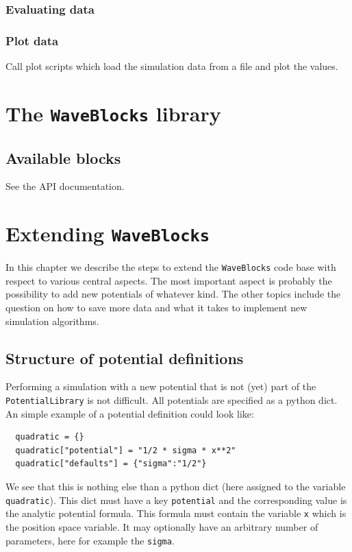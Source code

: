 \documentclass[a4paper,10pt]{report}
\begin{document}
\subsection{Evaluating data}

\subsection{Plot data}

Call plot scripts which load the simulation data from a file and plot the values.



\chapter{The \texttt{WaveBlocks} library}

\section{Available blocks}

See the API documentation.


\chapter{Extending \texttt{WaveBlocks}}

In this chapter we describe the steps to extend the \texttt{WaveBlocks}
code base with respect to various central aspects. The most important aspect
is probably the possibility to add new potentials of whatever kind. The other
topics include the question on how to save more data and what it takes to
implement new simulation algorithms.

\section{Structure of potential definitions}

Performing a simulation with a new potential that is not (yet) part of the
\texttt{PotentialLibrary} is not difficult. All potentials are specified
as a python dict. An simple example of a potential definition could look like:

\begin{verbatim}
  quadratic = {}
  quadratic["potential"] = "1/2 * sigma * x**2"
  quadratic["defaults"] = {"sigma":"1/2"}
\end{verbatim}

We see that this is nothing else than a python dict (here assigned to the
variable \texttt{quadratic}). This dict must have a key \texttt{potential}
and the corresponding value is the analytic potential formula. This formula
must contain the variable \texttt{x} which is the position space variable.
It may optionally have an arbitrary number of parameters, here for example
the \texttt{sigma}.
\end{document}
